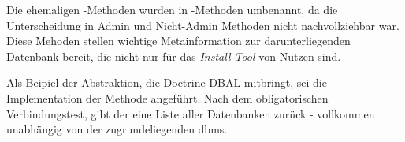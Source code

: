 
Die ehemaligen -Methoden wurden in -Methoden umbenannt, da die Unterscheidung in Admin und Nicht-Admin Methoden nicht nachvollziehbar war. Diese Mehoden stellen wichtige Metainformation zur darunterliegenden Datenbank bereit, die nicht nur für das \textit{Install Tool} von Nutzen sind.

Als Beipiel der Abstraktion, die Doctrine DBAL mitbringt, sei die Implementation der Methode  angeführt. Nach dem obligatorischen Verbindungstest, gibt der  eine Liste aller Datenbanken zurück - vollkommen unabhängig von der zugrundeliegenden \gls{dbms}.


